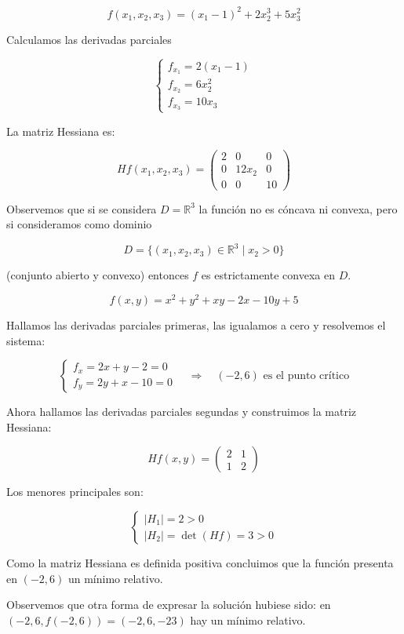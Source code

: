 \begin{Ejer}

\[
f(x_1,x_2,x_3)
= (x_1-1)^2 + 2x_2^3 + 5x_3^2
\]

Calculamos las derivadas parciales

\[
\begin{cases}
f_{x_1} = 2(x_1-1) \\
f_{x_2} = 6x_2^2 \\
f_{x_3} = 10x_3
\end{cases}
\]

La matriz Hessiana es:

\[
Hf(x_1,x_2,x_3)=
\begin{pmatrix}
2 & 0 & 0 \\
0 & 12x_2 & 0 \\
0 & 0 & 10
\end{pmatrix}
\]

Observemos que si se considera $D=\mathbb{R}^3$ la función no es c\'oncava ni convexa, 
pero si consideramos como dominio

\[
D=\{(x_1,x_2,x_3)\in\mathbb{R}^3 \mid x_2>0\}
\]

(conjunto abierto y convexo) entonces $f$ es estrictamente convexa en $D$.
\end{Ejer}

\begin{Ejer}

\[
f(x,y)=x^2+y^2+xy-2x-10y+5
\]

Hallamos las derivadas parciales primeras, las igualamos a cero y resolvemos el sistema:

\[
\begin{cases}
f_x = 2x+y-2=0\\
f_y = 2y+x-10=0
\end{cases}
\quad \Longrightarrow \quad (-2,6) \text{ es el punto crítico}
\]

Ahora hallamos las derivadas parciales segundas y construimos la matriz Hessiana:

\[
Hf(x,y)=
\begin{pmatrix}
2 & 1\\
1 & 2
\end{pmatrix}
\]

Los menores principales son:

\[
\begin{cases}
|H_1|=2>0\\
|H_2|=\det(Hf)=3>0
\end{cases}
\]

Como la matriz Hessiana es definida positiva concluimos que la función presenta en 
$(-2,6)$ un mínimo relativo.

Observemos que otra forma de expresar la solución hubiese sido: en 
$(-2,6,f(-2,6))=(-2,6,-23)$ hay un mínimo relativo.
\end{Ejer}


